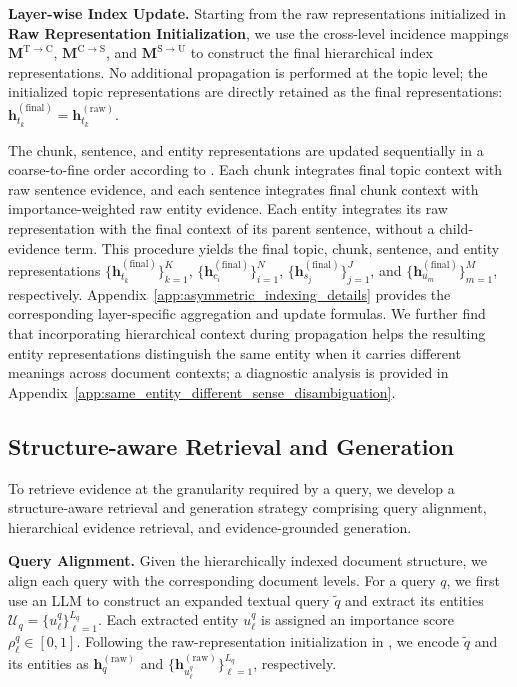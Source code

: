 \documentclass{article} %
\begin{document}
\smallskip
\noindent\textbf{Layer-wise Index Update.}
Starting from the raw representations initialized in \textbf{Raw Representation Initialization}, we use the cross-level incidence mappings $\mathbf{M}^{\mathrm{T}\to\mathrm{C}}$, $\mathbf{M}^{\mathrm{C}\to\mathrm{S}}$, and $\mathbf{M}^{\mathrm{S}\to\mathrm{U}}$ to construct the final hierarchical index representations. No additional propagation is performed at the topic level; the initialized topic representations are directly retained as the final representations: $\mathbf{h}_{t_k}^{(\mathrm{final})}=\mathbf{h}_{t_k}^{(\mathrm{raw})}$.

The chunk, sentence, and entity representations are updated sequentially in a coarse-to-fine order according to . Each chunk integrates final topic context with raw sentence evidence, and each sentence integrates final chunk context with importance-weighted raw entity evidence. Each entity integrates its raw representation with the final context of its parent sentence, without a child-evidence term. This procedure yields the final topic, chunk, sentence, and entity representations $\{\mathbf{h}_{t_k}^{(\mathrm{final})}\}_{k=1}^{K}$, $\{\mathbf{h}_{c_i}^{(\mathrm{final})}\}_{i=1}^{N}$, $\{\mathbf{h}_{s_j}^{(\mathrm{final})}\}_{j=1}^{J}$, and $\{\mathbf{h}_{u_m}^{(\mathrm{final})}\}_{m=1}^{M}$, respectively. Appendix~\ref{app:asymmetric_indexing_details} provides the corresponding layer-specific aggregation and update formulas. We further find that incorporating hierarchical context during propagation helps the resulting entity representations distinguish the same entity when it carries different meanings across document contexts; a diagnostic analysis is provided in Appendix~\ref{app:same_entity_different_sense_disambiguation}.

\subsection{Structure-aware Retrieval and Generation}

To retrieve evidence at the granularity required by a query, we develop a structure-aware retrieval and generation strategy comprising query alignment, hierarchical evidence retrieval, and evidence-grounded generation.

\smallskip
\noindent\textbf{Query Alignment.}
Given the hierarchically indexed document structure, we align each query with the corresponding document levels. For a query $q$, we first use an LLM to construct an expanded textual query $\tilde{q}$ and extract its entities $\mathcal{U}_{q}=\{u_{\ell}^{q}\}_{\ell=1}^{L_q}$. Each extracted entity $u_{\ell}^{q}$ is assigned an importance score $\rho_{\ell}^{q}\in[0,1]$. Following the raw-representation initialization in , we encode $\tilde{q}$ and its entities as $\mathbf{h}_{q}^{(\mathrm{raw})}$ and $\{\mathbf{h}_{u_{\ell}^{q}}^{(\mathrm{raw})}\}_{\ell=1}^{L_q}$, respectively.
\end{document}
